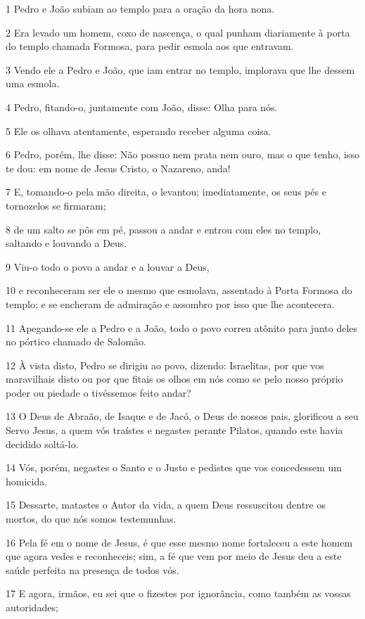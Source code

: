 \par 1 Pedro e João subiam ao templo para a oração da hora nona.
\par 2 Era levado um homem, coxo de nascença, o qual punham diariamente à porta do templo chamada Formosa, para pedir esmola aos que entravam.
\par 3 Vendo ele a Pedro e João, que iam entrar no templo, implorava que lhe dessem uma esmola.
\par 4 Pedro, fitando-o, juntamente com João, disse: Olha para nós.
\par 5 Ele os olhava atentamente, esperando receber alguma coisa.
\par 6 Pedro, porém, lhe disse: Não possuo nem prata nem ouro, mas o que tenho, isso te dou: em nome de Jesus Cristo, o Nazareno, anda!
\par 7 E, tomando-o pela mão direita, o levantou; imediatamente, os seus pés e tornozelos se firmaram;
\par 8 de um salto se pôs em pé, passou a andar e entrou com eles no templo, saltando e louvando a Deus.
\par 9 Viu-o todo o povo a andar e a louvar a Deus,
\par 10 e reconheceram ser ele o mesmo que esmolava, assentado à Porta Formosa do templo; e se encheram de admiração e assombro por isso que lhe acontecera.
\par 11 Apegando-se ele a Pedro e a João, todo o povo correu atônito para junto deles no pórtico chamado de Salomão.
\par 12 À vista disto, Pedro se dirigiu ao povo, dizendo: Israelitas, por que vos maravilhais disto ou por que fitais os olhos em nós como se pelo nosso próprio poder ou piedade o tivéssemos feito andar?
\par 13 O Deus de Abraão, de Isaque e de Jacó, o Deus de nossos pais, glorificou a seu Servo Jesus, a quem vós traístes e negastes perante Pilatos, quando este havia decidido soltá-lo.
\par 14 Vós, porém, negastes o Santo e o Justo e pedistes que vos concedessem um homicida.
\par 15 Dessarte, matastes o Autor da vida, a quem Deus ressuscitou dentre os mortos, do que nós somos testemunhas.
\par 16 Pela fé em o nome de Jesus, é que esse mesmo nome fortaleceu a este homem que agora vedes e reconheceis; sim, a fé que vem por meio de Jesus deu a este saúde perfeita na presença de todos vós.
\par 17 E agora, irmãos, eu sei que o fizestes por ignorância, como também as vossas autoridades;
